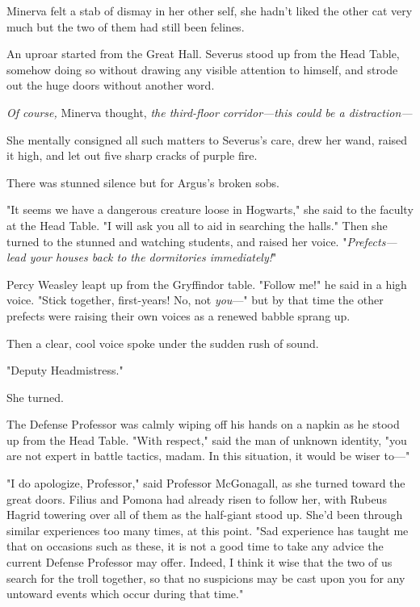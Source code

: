 Minerva felt a stab of dismay in her other self, she hadn't liked the other cat
very much but the two of them had still been felines.

An uproar started from the Great Hall. Severus stood up from the Head Table,
somehow doing so without drawing any visible attention to himself, and strode
out the huge doors without another word.

\emph{Of course,} Minerva thought, \emph{the third-floor corridor---this could
be a distraction---}

She mentally consigned all such matters to Severus's care, drew her wand,
raised it high, and let out five sharp cracks of purple fire.

There was stunned silence but for Argus's broken sobs.

"It seems we have a dangerous creature loose in Hogwarts," she said to the
faculty at the Head Table. "I will ask you all to aid in searching the halls."
Then she turned to the stunned and watching students, and raised her voice.
"\emph{Prefects---lead your houses back to the dormitories immediately!}"

Percy Weasley leapt up from the Gryffindor table. "Follow me!" he said in a
high voice. "Stick together, first-years! No, not \emph{you}\mbox{---}" but by that
time the other prefects were raising their own voices as a renewed babble
sprang up.

Then a clear, cool voice spoke under the sudden rush of sound.

"Deputy Headmistress."

She turned.

The Defense Professor was calmly wiping off his hands on a napkin as he stood
up from the Head Table. "With respect," said the man of unknown identity, "you
are not expert in battle tactics, madam. In this situation, it would be wiser
to\mbox{---}"

"I do apologize, Professor," said Professor McGonagall, as she turned toward
the great doors. Filius and Pomona had already risen to follow her, with Rubeus
Hagrid towering over all of them as the half-giant stood up. She'd been through
similar experiences too many times, at this point. "Sad experience has taught
me that on occasions such as these, it is not a good time to take any advice
the current Defense Professor may offer. Indeed, I think it wise that the two
of us search for the troll together, so that no suspicions may be cast upon you
for any untoward events which occur during that time."

